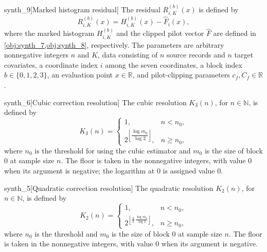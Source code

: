 \begin{definitionv}{synth_9}[Marked histogram residual]
The residual \(R_{i,K}^{(b)}(x)\) is defined by
\[
R_{i,K}^{(b)}(x)
=
H_{i,K}^{(b)}(x)-\widehat F_i(x),
\]
where the marked histogram \(H_{i,K}^{(b)}\) and the clipped pilot vector \(\widehat F\) are defined in \cref{obj:synth_7,obj:synth_8}, respectively. The parameters are arbitrary nonnegative integers \(n\) and \(K\), data consisting of \(n\) source records and \(n\) target covariates, a coordinate index \(i\) among the seven coordinates, a block index \(b\in\{0,1,2,3\}\), an evaluation point \(x\in\mathbb R\), and pilot-clipping parameters \(c_f,C_f\in\mathbb R\).
\end{definitionv}

\begin{definitionv}{synth_6}[Cubic correction resolution]
The cubic resolution \(K_3(n)\), for \(n\in\mathbb N\), is defined by
\[
K_3(n)=
\begin{cases}
1, & n<n_0,\\[2pt]
2^{\left\lfloor \dfrac{\log m_0}{\log 2}\right\rfloor}, & n\ge n_0,
\end{cases}
\]
where \(n_0\) is the threshold for using the cubic estimator and \(m_0\) is the size of block \(0\) at sample size \(n\). The floor is taken in the nonnegative integers, with value \(0\) when its argument is negative; the logarithm at \(0\) is assigned value \(0\).
\end{definitionv}

\begin{definitionv}{synth_5}[Quadratic correction resolution]
The quadratic resolution \(K_2(n)\), for \(n\in\mathbb N\), is defined by
\[
K_2(n)=
\begin{cases}
1, & n<n_0,\\[2pt]
2^{\left\lfloor \frac{4}{3}\,\frac{\log m_0}{\log 2}\right\rfloor},
& n\ge n_0,
\end{cases}
\]
where \(n_0\) is the threshold and \(m_0\) is the size of block \(0\) at sample size \(n\). The floor is taken in the nonnegative integers, with value \(0\) when its argument is negative.
\end{definitionv}

